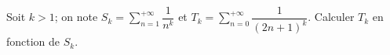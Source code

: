 Soit $k>1$; on note $S_k=\displaystyle\sum_{n=1}^{+\infty} \dfrac{1}{n^k}$ et $T_k=\displaystyle\sum_{n=0}^{+\infty} \dfrac{1}{(2 n+1)^k}$. Calculer $T_k$ en fonction de $S_k$.
